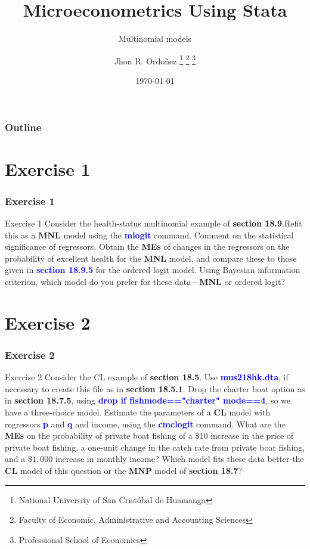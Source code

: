 \documentclass[11pt, aspectratio=169]{beamer}
\title{Microeconometrics Using Stata}
\subtitle{Multinomial models}
\author{
		Jhon R. Ordoñez
		\footnote{\label{1} National University of San Cristóbal de Huamanga}
		\footnote{\label{2} Faculty of Economic, Administrative and Accounting Sciences}
		\footnote{\label{3} Professional School of Economics}
	}
\date{\today}
\begin{document}
	\begin{frame}
		\maketitle
	\end{frame}
	\begin{frame}[t]
		\frametitle{Outline}
		\tableofcontents
	\end{frame}
	\section{Exercise 1}
		\begin{frame}
			\frametitle{Exercise 1}
				\begin{block}{Exercise 1}
					Consider the health-status multinomial example of \textcolor{red!50}{\textbf{section 18.9}}.Refit
					this as a \textbf{MNL} model using the \textcolor{blue}{\textbf{mlogit}} command. Comment on the
					statistical significance of regressors. Obtain the \textbf{MEs} of changes in the
					regressors on the probability of excellent health for the \textbf{MNL} model, and
					compare these to those given in \textcolor{blue}{\textbf{section 18.9.5}} for the ordered logit
					model. Using Bayesian information criterion, which model do you
					prefer for these data - \textbf{MNL} or ordered logit?
				\end{block}
		\end{frame}
	\section{Exercise 2}
		\begin{frame}
			\frametitle{Exercise 2}
			\begin{block}{Exercise 2}
				Consider the CL example of \textcolor{red!50}{\textbf{section 18.5}}. Use \textcolor{blue}{\textbf{mus218hk.dta}}, if
				necessary to create this file as in \textcolor{red!50}{\textbf{section 18.5.1}}. Drop the charter boat
				option as in \textcolor{red!50}{\textbf{section 18.7.5}}, using \textcolor{blue}{\textbf{drop if fishmode=="charter"
				mode==4}}, so we have a three-choice model. Estimate the parameters of
				a \textbf{CL} model with regressors \textcolor{blue}{\textbf{p}} and \textcolor{blue}{\textbf{q}} and income, using the \textcolor{blue}{\textbf{cmclogit}}
				command. What are the \textbf{MEs} on the probability of private boat fishing
				of a $\$10$ increase in the price of private boat fishing, a one-unit change
				in the catch rate from private boat fishing, and a $\$1,000$ increase in
				monthly income? Which model fits these data better-the \textbf{CL} model of
				this question or the \textbf{MNP} model of \textcolor{red!50}{\textbf{section 18.7}}?
			\end{block}
		\end{frame}
\end{document}
